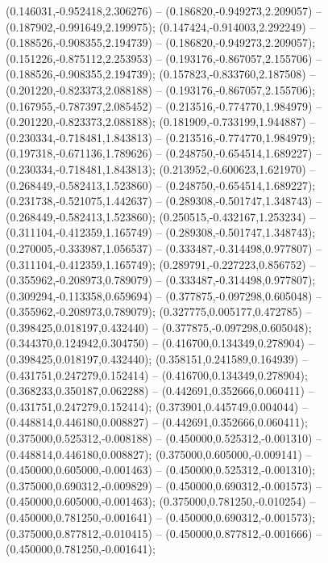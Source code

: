  (0.146031,-0.952418,2.306276) -- (0.186820,-0.949273,2.209057) -- (0.187902,-0.991649,2.199975);
 (0.147424,-0.914003,2.292249) -- (0.188526,-0.908355,2.194739) -- (0.186820,-0.949273,2.209057);
 (0.151226,-0.875112,2.253953) -- (0.193176,-0.867057,2.155706) -- (0.188526,-0.908355,2.194739);
 (0.157823,-0.833760,2.187508) -- (0.201220,-0.823373,2.088188) -- (0.193176,-0.867057,2.155706);
 (0.167955,-0.787397,2.085452) -- (0.213516,-0.774770,1.984979) -- (0.201220,-0.823373,2.088188);
 (0.181909,-0.733199,1.944887) -- (0.230334,-0.718481,1.843813) -- (0.213516,-0.774770,1.984979);
 (0.197318,-0.671136,1.789626) -- (0.248750,-0.654514,1.689227) -- (0.230334,-0.718481,1.843813);
 (0.213952,-0.600623,1.621970) -- (0.268449,-0.582413,1.523860) -- (0.248750,-0.654514,1.689227);
 (0.231738,-0.521075,1.442637) -- (0.289308,-0.501747,1.348743) -- (0.268449,-0.582413,1.523860);
 (0.250515,-0.432167,1.253234) -- (0.311104,-0.412359,1.165749) -- (0.289308,-0.501747,1.348743);
 (0.270005,-0.333987,1.056537) -- (0.333487,-0.314498,0.977807) -- (0.311104,-0.412359,1.165749);
 (0.289791,-0.227223,0.856752) -- (0.355962,-0.208973,0.789079) -- (0.333487,-0.314498,0.977807);
 (0.309294,-0.113358,0.659694) -- (0.377875,-0.097298,0.605048) -- (0.355962,-0.208973,0.789079);
 (0.327775,0.005177,0.472785) -- (0.398425,0.018197,0.432440) -- (0.377875,-0.097298,0.605048);
 (0.344370,0.124942,0.304750) -- (0.416700,0.134349,0.278904) -- (0.398425,0.018197,0.432440);
 (0.358151,0.241589,0.164939) -- (0.431751,0.247279,0.152414) -- (0.416700,0.134349,0.278904);
 (0.368233,0.350187,0.062288) -- (0.442691,0.352666,0.060411) -- (0.431751,0.247279,0.152414);
 (0.373901,0.445749,0.004044) -- (0.448814,0.446180,0.008827) -- (0.442691,0.352666,0.060411);
 (0.375000,0.525312,-0.008188) -- (0.450000,0.525312,-0.001310) -- (0.448814,0.446180,0.008827);
 (0.375000,0.605000,-0.009141) -- (0.450000,0.605000,-0.001463) -- (0.450000,0.525312,-0.001310);
 (0.375000,0.690312,-0.009829) -- (0.450000,0.690312,-0.001573) -- (0.450000,0.605000,-0.001463);
 (0.375000,0.781250,-0.010254) -- (0.450000,0.781250,-0.001641) -- (0.450000,0.690312,-0.001573);
 (0.375000,0.877812,-0.010415) -- (0.450000,0.877812,-0.001666) -- (0.450000,0.781250,-0.001641);
